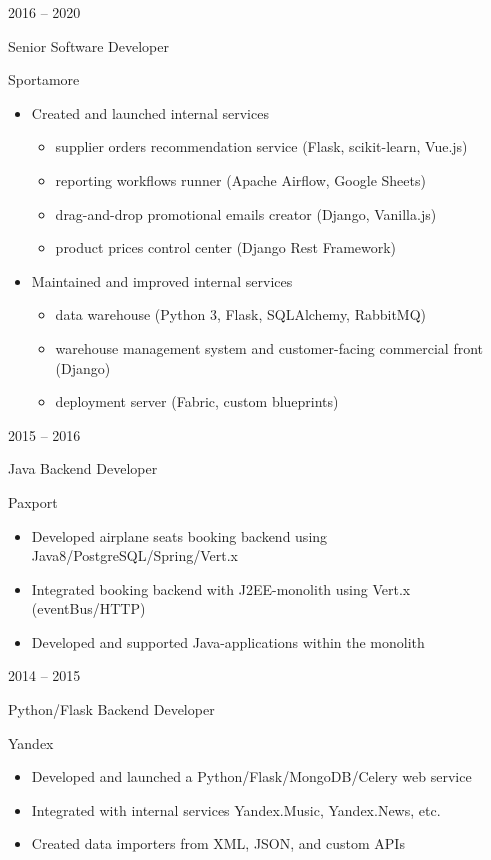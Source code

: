 \documentclass[a4paper,10pt]{article}
\newlength{\cvcolumngapwidth}
\newlength{\cvleftcolumnwidth}
\newlength{\cvrightcolumnwidth}
\newcommand{\cvtitlestyle}[1]{{\large\cvtitlefont\textcolor{cvtitlecolor}{#1}}}
\newcommand{\cvdurationstyle}[1]{{\small\cvdurationfont\textcolor{cvdurationcolor}{#1}}}
\newlength{\cvafteritemskipamount}
\newlength{\cvaftertitleskipamount}
\newlength{\cvparskip}
\newcommand{\cvitem}[2]{
    \begin{minipage}[t]{\cvleftcolumnwidth}
        \raggedleft #1
    \end{minipage}%
    \hspace{\cvcolumngapwidth}%
    \begin{minipage}[t]{\cvrightcolumnwidth}
        \setlength{\parskip}{\cvparskip} #2
    \end{minipage}

    \vspace{\cvafteritemskipamount}
}
\newcommand{\cvtitle}[1]{
    \cvtitlestyle{#1}

    \vspace{\cvaftertitleskipamount}
    \vspace{-\cvparskip}
}
\begin{document}
\cvitem{
    \cvdurationstyle{2016 -- 2020}
}{
    \cvtitle{Senior Software Developer}

    Sportamore

    \begin{itemize}[leftmargin=*]
        \item Created and launched internal services
	    \begin{itemize}[leftmargin=*]
		  \item supplier orders recommendation service (Flask, scikit-learn, Vue.js)
		  \item reporting workflows runner (Apache Airflow, Google Sheets)
		  \item drag-and-drop promotional emails creator (Django, Vanilla.js)
		  \item product prices control center (Django Rest Framework)
	    \end{itemize}
    \end{itemize}

    \begin{itemize}[leftmargin=*]
        \item Maintained and improved internal services 
	    \begin{itemize}[leftmargin=*]
		  \item data warehouse (Python 3, Flask, SQLAlchemy, RabbitMQ)
                  \item warehouse management system and customer-facing commercial front (Django)
		  \item deployment server (Fabric, custom blueprints)
	    \end{itemize}
    \end{itemize}
}

\cvitem{
    \cvdurationstyle{2015 -- 2016}
}{
    \cvtitle{Java Backend Developer}

    Paxport

    \begin{itemize}[leftmargin=*]
	\item Developed airplane seats booking backend using Java8/PostgreSQL/Spring/Vert.x
	\item Integrated booking backend with J2EE-monolith using Vert.x (eventBus/HTTP)
	\item Developed and supported Java-applications within the monolith
    \end{itemize}
}

\cvitem{
    \cvdurationstyle{2014 -- 2015}
}{
    \cvtitle{Python/Flask Backend Developer}

    Yandex

    \begin{itemize}[leftmargin=*]
	\item Developed and launched a Python/Flask/MongoDB/Celery web service
	\item Integrated with internal services Yandex.Music, Yandex.News, etc.
	\item Created data importers from XML, JSON, and custom APIs
    \end{itemize}
}
\end{document}
